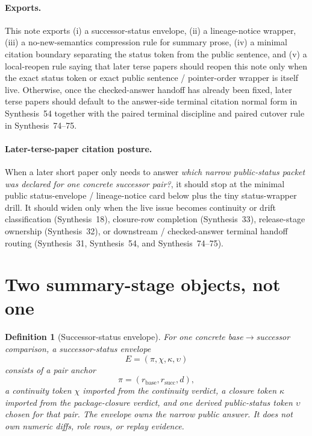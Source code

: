 \documentclass[11pt]{article}
\newtheorem{definition}{Definition}
\begin{document}
\paragraph{Exports.}
This note exports (i) a successor-status envelope, (ii) a lineage-notice wrapper, (iii) a no-new-semantics compression rule for summary prose, (iv) a minimal citation boundary separating the status token from the public sentence, and (v) a local-reopen rule saying that later terse papers should reopen this note only when the exact status token or exact public sentence / pointer-order wrapper is itself live. Otherwise, once the checked-answer handoff has already been fixed, later terse papers should default to the answer-side terminal citation normal form in Synthesis~54 together with the paired terminal discipline and paired cutover rule in Synthesis~74--75.\cite{series:challengeanswerreviewmenus,series:pairedterminalcitationdiscipline,series:pairedterminalcutoverrules}

\paragraph{Later-terse-paper citation posture.}
When a later short paper only needs to answer \emph{which narrow public-status packet was declared for one concrete successor pair?}, it should stop at the minimal public status-envelope / lineage-notice card below plus the tiny status-wrapper drill. It should widen only when the live issue becomes continuity or drift classification (Synthesis~18), closure-row completion (Synthesis~33), release-stage ownership (Synthesis~32), or downstream / checked-answer terminal handoff routing (Synthesis~31, Synthesis~54, and Synthesis~74--75).\cite{series:planstateequiv,series:releaseclosure,series:releasespine,series:downstreamnormalforms,series:challengeanswerreviewmenus,series:pairedterminalcitationdiscipline,series:pairedterminalcutoverrules}

\section{Two summary-stage objects, not one}

\begin{definition}[Successor-status envelope]
For one concrete base$\to$successor comparison, a \emph{successor-status envelope}
\[
E=(\pi,\chi,\kappa,\upsilon)
\]
consists of a pair anchor
\[
\pi=(r_{\mathrm{base}},r_{\mathrm{succ}},d),
\]
a continuity token $\chi$ imported from the continuity verdict, a closure token $\kappa$ imported from the package-closure verdict, and one derived public-status token $\upsilon$ chosen for that pair.
The envelope owns the narrow public answer.
It does not own numeric diffs, role rows, or replay evidence.
\end{definition}
\end{document}
